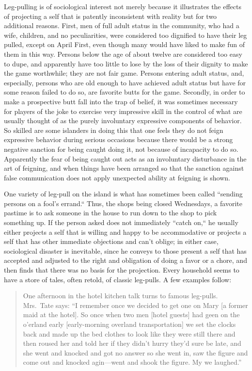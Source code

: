 \documentclass[twoside,symmetric,nobib,justified]{tufte-book}
\begin{document}
Leg-pulling is of sociological interest not merely because it
illustrates the effects of projecting a self that is patently
inconsistent with reality but for two additional reasons. First, men of
full adult status in the community, who had a wife, children, and no
peculiarities, were considered too dignified to have their leg pulled,
except on April First, even though many would have liked to make fun of
them in this way. Persons below the age of about twelve are considered
too easy to dupe, and apparently have too little to lose by the loss of
their dignity to make the game worthwhile; they are not fair game.
Persons entering adult status, and, especially, persons who are old
enough to have achieved adult status but have for some reason failed to
do so, are favorite butts for the game. Secondly, in order to make a
prospective butt fall into the trap of belief, it was sometimes
necessary for players of the joke to exercise very impressive skill in
the control of what are usually thought of as the purely involuntary
expressive components of behavior. So skilled are some islanders in
doing this that one feels they do not feign expressive behavior during
serious occasions because there would be a strong negative sanction for
being caught doing it, not because of incapacity to do so. Apparently
the fear of being caught out acts as an involuntary disturbance in the
art of feigning, and when things have been arranged so that the sanction
against false communication does not apply unexpected ability at
feigning is shown.

One variety of leg-pull on the island is what has sometimes been called
``sending persons on a fool's errand.`` Thus, the shops being closed
Wednesdays, a favorite pastime is to ask someone in the house to run
down to the shop to pick something up. If the person asked does not
immediately ``catch on,`` he usually either projects a self that is
willing and happy to be accommodative or projects a self that has other
immediate objections and can't oblige; in either case, sociological
disaster is inevitable, since he conveys to those present a self that
has accepted and adjusted to the right and obligation of doing a favor
or a chore, and then finds that there was no basis for the projection.
Every household seems to have a store of tales, often retold, of classic
leg-pulls. A few examples follow:

\begin{quote}
One afternoon in the hotel kitchen talk turns to famous leg-pulls.
Mrs.~Tate says: ``I remember once we decided to get one on Mary {[}a
former maid at the hotel{]}. So once when two men {[}hotel guests{]} had
geen on the o'erland early {[}early-morning overland transportation{]}
we set the clocks back and made up the bed clothes to look like they
were still there and then roused her and told her if they didn't hurry
they'd sure be late, and she went and knocked and got no answer so she
went in, saw the figure and come out and knocked agin---went and shook
the figure. My we laughed.''
\end{quote}
\end{document}
